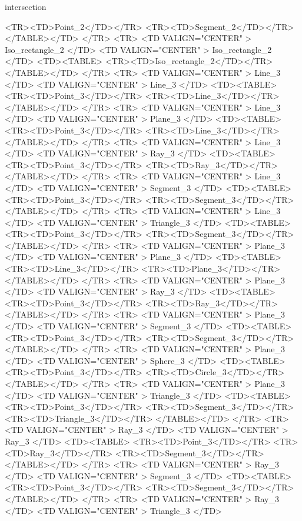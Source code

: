 \begin{ccRefFunction}{intersection}
\begin{ccHtmlOnly}
	<TR><TD>Point_2</TD></TR>
	<TR><TD>Segment_2</TD></TR>
      </TABLE></TD>
</TR>
<TR>
    <TD VALIGN="CENTER" > Iso_rectangle_2 </TD>
    <TD VALIGN="CENTER" > Iso_rectangle_2 </TD>
    <TD><TABLE>
	<TR><TD>Iso_rectangle_2</TD></TR>
      </TABLE></TD>
</TR>
<TR>
    <TD VALIGN="CENTER" > Line_3 </TD>
    <TD VALIGN="CENTER" > Line_3 </TD>
    <TD><TABLE>
	<TR><TD>Point_3</TD></TR>
	<TR><TD>Line_3</TD></TR>
        </TABLE></TD>
</TR>
<TR>
    <TD VALIGN="CENTER" > Line_3 </TD>
    <TD VALIGN="CENTER" > Plane_3 </TD>
    <TD><TABLE>
	<TR><TD>Point_3</TD></TR>
	<TR><TD>Line_3</TD></TR>
        </TABLE></TD>
</TR>
<TR>
    <TD VALIGN="CENTER" > Line_3 </TD>
    <TD VALIGN="CENTER" > Ray_3 </TD>
    <TD><TABLE>
	<TR><TD>Point_3</TD></TR>
	<TR><TD>Ray_3</TD></TR>
        </TABLE></TD>
</TR>
<TR>
    <TD VALIGN="CENTER" > Line_3 </TD>
    <TD VALIGN="CENTER" > Segment_3 </TD>
    <TD><TABLE>
	<TR><TD>Point_3</TD></TR>
	<TR><TD>Segment_3</TD></TR>
        </TABLE></TD>
</TR>
<TR>
    <TD VALIGN="CENTER" > Line_3 </TD>
    <TD VALIGN="CENTER" > Triangle_3 </TD>
    <TD><TABLE>
	<TR><TD>Point_3</TD></TR>
	<TR><TD>Segment_3</TD></TR>
        </TABLE></TD>
</TR>
<TR>
    <TD VALIGN="CENTER" > Plane_3 </TD>
    <TD VALIGN="CENTER" > Plane_3 </TD>
    <TD><TABLE>
	<TR><TD>Line_3</TD></TR>
	<TR><TD>Plane_3</TD></TR>
        </TABLE></TD>
</TR>
<TR>
    <TD VALIGN="CENTER" > Plane_3 </TD>
    <TD VALIGN="CENTER" > Ray_3 </TD>
    <TD><TABLE>
	<TR><TD>Point_3</TD></TR>
	<TR><TD>Ray_3</TD></TR>
        </TABLE></TD>
</TR>
<TR>
    <TD VALIGN="CENTER" > Plane_3 </TD>
    <TD VALIGN="CENTER" > Segment_3 </TD>
    <TD><TABLE>
	<TR><TD>Point_3</TD></TR>
	<TR><TD>Segment_3</TD></TR>
        </TABLE></TD>
</TR>
<TR>
    <TD VALIGN="CENTER" > Plane_3 </TD>
    <TD VALIGN="CENTER" > Sphere_3 </TD>
    <TD><TABLE>
	<TR><TD>Point_3</TD></TR>
	<TR><TD>Circle_3</TD></TR>
        </TABLE></TD>
</TR>
<TR>
    <TD VALIGN="CENTER" > Plane_3 </TD>
    <TD VALIGN="CENTER" > Triangle_3 </TD>
    <TD><TABLE>
	<TR><TD>Point_3</TD></TR>
	<TR><TD>Segment_3</TD></TR>
	<TR><TD>Triangle_3</TD></TR>
        </TABLE></TD>
</TR>
<TR>
    <TD VALIGN="CENTER" > Ray_3 </TD>
    <TD VALIGN="CENTER" > Ray_3 </TD>
    <TD><TABLE>
	<TR><TD>Point_3</TD></TR>
	<TR><TD>Ray_3</TD></TR>
        <TR><TD>Segment_3</TD></TR>
        </TABLE></TD>
</TR>
<TR>
    <TD VALIGN="CENTER" > Ray_3 </TD>
    <TD VALIGN="CENTER" > Segment_3 </TD>
    <TD><TABLE>
	<TR><TD>Point_3</TD></TR>
	<TR><TD>Segment_3</TD></TR>
        </TABLE></TD>
</TR>
<TR>
    <TD VALIGN="CENTER" > Ray_3 </TD>
    <TD VALIGN="CENTER" > Triangle_3 </TD>

\end{ccHtmlOnly}
\end{ccRefFunction}
